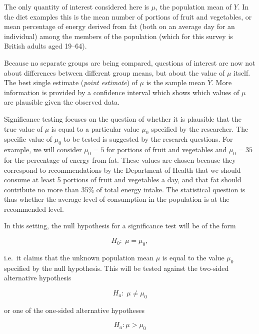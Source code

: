 \documentclass[11pt,a4paper,openany]{book}
\begin{document}
The only quantity of interest considered here is \(\mu\), the population
mean of \(Y\). In the diet examples this is the mean number of portions
of fruit and vegetables, or mean percentage of energy derived from fat
(both on an average day for an individual) among the members of the
population (which for this survey is British adults aged 19--64).

Because no separate groups are being compared, questions of interest are
now not about differences between different group means, but about the
value of \(\mu\) itself. The best single estimate (\emph{point
estimate}) of \(\mu\) is the sample mean \(\bar{Y}\). More information
is provided by a confidence interval which shows which values of \(\mu\)
are plausible given the observed data.

Significance testing focuses on the question of whether it is plausible
that the true value of \(\mu\) is equal to a particular value
\(\mu_{0}\) specified by the researcher. The specific value of
\(\mu_{0}\) to be tested is suggested by the research questions. For
example, we will consider \(\mu_{0}=5\) for portions of fruit and
vegetables and \(\mu_{0}=35\) for the percentage of energy from fat.
These values are chosen because they correspond to recommendations by
the Department of Health that we should consume at least 5 portions of
fruit and vegetables a day, and that fat should contribute no more than
35\% of total energy intake. The statistical question is thus whether
the average level of consumption in the population is at the recommended
level.

In this setting, the null hypothesis for a significance test will be of
the form

\begin{equation}H_{0}: \; \mu=\mu_{0},
\label{eq:H01}\end{equation}

i.e.~it claims that the unknown population mean \(\mu\) is equal to the
value \(\mu_{0}\) specified by the null hypothesis. This will be tested
against the two-sided alternative hypothesis

\begin{equation}H_{a}: \; \mu\ne \mu_{0}
\label{eq:Ha1two}\end{equation}

or one of the one-sided alternative hypotheses

\begin{equation}H_{a}:  \mu> \mu_{0} \label{eq:Ha1onegt}\end{equation}
\end{document}
